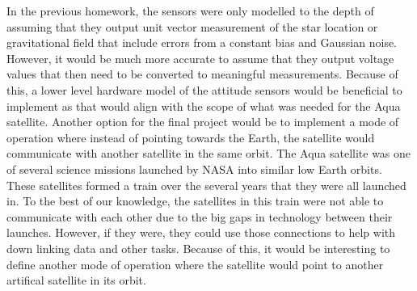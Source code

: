 In the previous homework, the sensors were only modelled to the depth of assuming that they output unit vector measurement of the star location or gravitational field that
include errors from a constant bias and Gaussian noise. However, it would be much more accurate to assume that they output voltage values that then need to be converted to meaningful measurements. Because of this, a lower level hardware model of the attitude sensors would be beneficial to implement as that would align with the scope of what was needed for the Aqua satellite. Another option for the final project would be to implement a mode of operation where instead of pointing towards the Earth, the satellite would communicate with another satellite in the same orbit. The Aqua satellite was one of several science missions launched by NASA into similar low Earth orbits. These satellites formed a train over the several years that they were all launched in. To the best of our knowledge, the satellites in this train were not able to communicate with each other due to the big gaps in technology between their launches. However, if they were, they could use those connections to help with down linking data and other tasks. Because of this, it would be interesting to define another mode of operation where the satellite would point to another artifical satellite in its orbit.